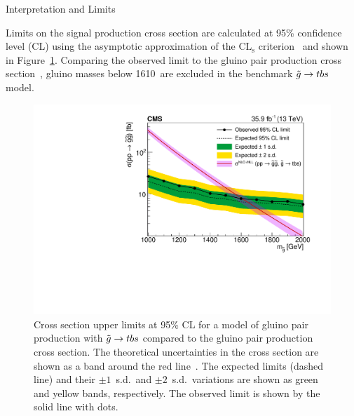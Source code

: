 \begin{section}{Interpretation and Limits}

Limits on the signal production cross section are calculated at 95\% confidence level (CL) using the asymptotic approximation of the $\textrm{CL}_\textrm{s}$ criterion~\cite{0954-3899-28-10-313,CMS-NOTE-2011-005,Cowan:2010js,Junk:1999kv} and shown in Figure~\ref{fig:limits}.
Comparing the observed limit to the gluino pair production cross section~\cite{XSecgluinogluino}, gluino masses below 1610~\GeV are excluded in the benchmark $\tilde{g} \to tbs$ model.

\begin{figure}[tbp!]
\centering
\includegraphics[angle=0,width=0.80\columnwidth]{fig/limits.pdf}
\caption{Cross section upper limits at 95\% CL for a model of gluino pair production with $\tilde{g} \to tbs$ compared to the gluino pair production cross section.
The theoretical uncertainties in the cross section are shown as a band around the
red line~\cite{XSecgluinogluino}.
The expected limits (dashed line) and their $\pm1$~s.d.\ and $\pm2$~s.d.\ variations are shown as green and yellow bands, respectively.
The observed limit is shown by the solid line with dots.}
\label{fig:limits}
\end{figure}

\end{section}
